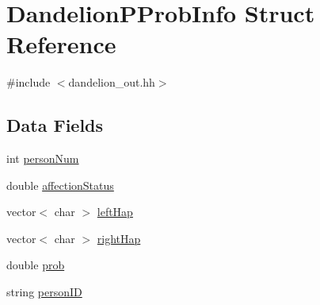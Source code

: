 \hypertarget{structDandelionPProbInfo}{
\section{DandelionPProbInfo Struct Reference}
\label{structDandelionPProbInfo}
}


{\ttfamily \#include $<$dandelion\_\-out.hh$>$}

\subsection*{Data Fields}
\begin{DoxyCompactItemize}
\item 
int \hyperlink{structDandelionPProbInfo_a4acbb51690c01dfaa81827a2ef8ae5ad}{personNum}
\item 
double \hyperlink{structDandelionPProbInfo_aa0be0c72636bfa42d72322b0f16bd3a0}{affectionStatus}
\item 
vector$<$ char $>$ \hyperlink{structDandelionPProbInfo_a7613ee43c9ecc04d4443e4df209b9577}{leftHap}
\item 
vector$<$ char $>$ \hyperlink{structDandelionPProbInfo_a015d844a48d0b96a19684df86b0bf959}{rightHap}
\item 
double \hyperlink{structDandelionPProbInfo_ac4034ca65eee810a5f0267baa47f1420}{prob}
\item 
string \hyperlink{structDandelionPProbInfo_a19a65f30f8d4ee9272191119b35724f5}{personID}
\end{DoxyCompactItemize}


